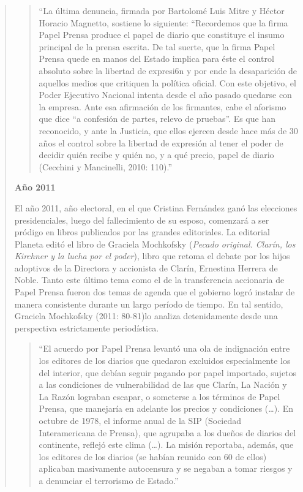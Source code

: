 \begin{quote}
\begin{quote}
	\enquote{La última denuncia, firmada por Bartolomé Luis Mitre y Héctor Horacio Magnetto, sostiene lo siguiente: ``Recordemos que la firma Papel Prensa produce el papel de diario que constituye el insumo principal de la prensa escrita. De tal suerte, que la firma Papel Prensa quede en manos del Estado implica para éste el control absoluto sobre la libertad de expresi6n y por ende la desaparición de aquellos medios que critiquen la política oficial. Con este objetivo, el Poder Ejecutivo Nacional intenta  desde el año pasado quedarse con la empresa. Ante esa afirmación de los firmantes, cabe el aforismo que dice ``a confesión de partes, relevo de pruebas''. Es que han reconocido, y ante la Justicia, que ellos ejercen desde hace más de 30 años el control sobre la libertad de expresión al tener el poder de decidir quién recibe y quién no, y a qué precio, papel de diario (Cecchini y Mancinelli, 2010: 110).}
\end{quote}


\textbf{ Año 2011}

El año 2011, año electoral, en el que Cristina Fernández ganó las elecciones presidenciales, luego del fallecimiento de su esposo, comenzará a ser pródigo en libros publicados por las grandes editoriales. La editorial Planeta editó el libro de Graciela Mochkofsky (\emph{Pecado original. Clarín, los Kirchner y la lucha por el poder}), libro que retoma el debate por los hijos adoptivos de la Directora y accionista de Clarín, Ernestina Herrera de Noble. Tanto este último tema como el de la transferencia accionaria de Papel Prensa fueron dos temas de agenda que el gobierno logró instalar de manera consistente durante un largo período de tiempo. En tal sentido, Graciela Mochkofsky (2011: 80-81)lo analiza detenidamente desde una perspectiva estrictamente periodística.

\begin{quote}
	\enquote{El acuerdo por Papel Prensa levantó una ola de indignación entre los editores de los diarios que quedaron excluidos especialmente los del interior, que debían seguir pagando por papel importado, sujetos a las condiciones de vulnerabilidad de las que Clarín, La Nación y La Razón lograban escapar, o someterse a los términos de Papel Prensa, que manejaría en adelante los precios y condiciones (\dots). En octubre de 1978, el informe anual de la SIP (Sociedad Interamericana de Prensa), que agrupaba a los dueños de diarios del continente, reflejó este clima (\dots). La misión reportaba, además, que los editores de los diarios (se habían reunido con 60 de ellos) aplicaban masivamente autocensura y se negaban a tomar riesgos y a denunciar el terrorismo de Estado.}
\end{quote}



\end{quote}
